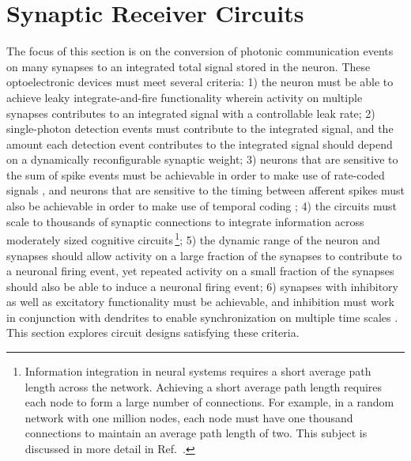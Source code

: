 \documentclass[twocolumn]{article}
\newcommand{\onlinecite}[1]{\hspace{-1 ex} \nocite{#1}\citenum{#1}}
\begin{document}
\section{\label{sec:receiverCircuits}Synaptic Receiver Circuits}
The focus of this section is on the conversion of photonic communication events on many synapses to an integrated total signal stored in the neuron. These optoelectronic devices must meet several criteria: 1) the neuron must be able to achieve leaky integrate-and-fire functionality \cite{daab2001,geki2002} wherein activity on multiple synapses contributes to an integrated signal with a controllable leak rate; 2) single-photon detection events must contribute to the integrated signal, and the amount each detection event contributes to the integrated signal should depend on a dynamically reconfigurable synaptic weight; 3) neurons that are sensitive to the sum of spike events must be achievable in order to make use of rate-coded signals \cite{st1967}, and neurons that are sensitive to the timing between afferent spikes must also be achievable in order to make use of temporal coding \cite{thde2001,geki2002,sase2001,stgo2005}; 4) the circuits must scale to thousands of synaptic connections to integrate information across moderately sized cognitive circuits\,\footnote{Information integration in neural systems requires a short average path length across the network. Achieving a short average path length requires each node to form a large number of connections. For example, in a random network with one million nodes, each node must have one thousand connections to maintain an average path length of two. This subject is discussed in more detail in Ref.\,\onlinecite{sh2018_ICRC}.}; 5) the dynamic range of the neuron and synapses should allow activity on a large fraction of the synapses to contribute to a neuronal firing event, yet repeated activity on a small fraction of the synapses should also be able to induce a neuronal firing event; 6) synapses with inhibitory as well as excitatory functionality must be achievable, and inhibition must work in conjunction with dendrites \cite{budr2004,bu2006,haah2015} to enable synchronization on multiple time scales \cite{sase2001,enfr2001,vala2001,budr2004,robu2015}. This section explores circuit designs satisfying these criteria. 
	
\end{document}
